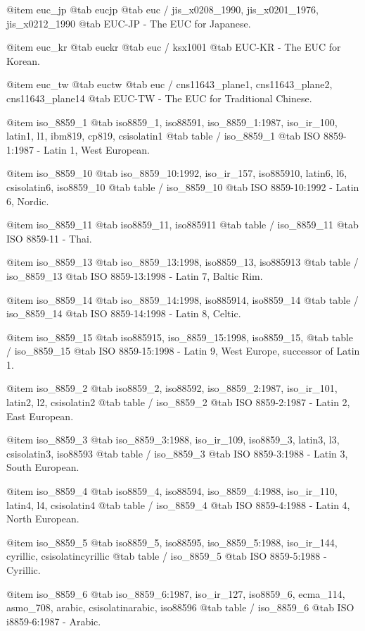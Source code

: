 @item
euc_jp
@tab
eucjp
@tab
euc / jis_x0208_1990, jis_x0201_1976, jis_x0212_1990
@tab
EUC-JP - The EUC for Japanese.


@item
euc_kr
@tab
euckr
@tab
euc / ksx1001
@tab
EUC-KR - The EUC for Korean.


@item
euc_tw
@tab
euctw
@tab
euc / cns11643_plane1, cns11643_plane2, cns11643_plane14
@tab
EUC-TW - The EUC for Traditional Chinese.


@item
iso_8859_1
@tab
iso8859_1, iso88591, iso_8859_1:1987, iso_ir_100, latin1, l1, ibm819, cp819, csisolatin1
@tab
table / iso_8859_1
@tab
ISO 8859-1:1987 - Latin 1, West European.


@item
iso_8859_10
@tab
iso_8859_10:1992, iso_ir_157, iso885910, latin6, l6, csisolatin6, iso8859_10
@tab
table / iso_8859_10
@tab
ISO 8859-10:1992 - Latin 6, Nordic.


@item
iso_8859_11
@tab
iso8859_11, iso885911
@tab
table / iso_8859_11
@tab
ISO 8859-11 - Thai.


@item
iso_8859_13
@tab
iso_8859_13:1998, iso8859_13, iso885913
@tab
table / iso_8859_13
@tab
ISO 8859-13:1998 - Latin 7, Baltic Rim.


@item
iso_8859_14
@tab
iso_8859_14:1998, iso885914, iso8859_14
@tab
table / iso_8859_14
@tab
ISO 8859-14:1998 - Latin 8, Celtic.


@item
iso_8859_15
@tab
iso885915, iso_8859_15:1998, iso8859_15, 
@tab
table / iso_8859_15
@tab
ISO 8859-15:1998 - Latin 9, West Europe, successor of Latin 1.


@item
iso_8859_2
@tab
iso8859_2, iso88592, iso_8859_2:1987, iso_ir_101, latin2, l2, csisolatin2
@tab
table / iso_8859_2
@tab
ISO 8859-2:1987 - Latin 2, East European.


@item
iso_8859_3
@tab
iso_8859_3:1988, iso_ir_109, iso8859_3, latin3, l3, csisolatin3, iso88593
@tab
table / iso_8859_3
@tab
ISO 8859-3:1988 - Latin 3, South European.


@item
iso_8859_4
@tab
iso8859_4, iso88594, iso_8859_4:1988, iso_ir_110, latin4, l4, csisolatin4
@tab
table / iso_8859_4
@tab
ISO 8859-4:1988 - Latin 4, North European.


@item
iso_8859_5
@tab
iso8859_5, iso88595, iso_8859_5:1988, iso_ir_144, cyrillic, csisolatincyrillic
@tab
table / iso_8859_5
@tab
ISO 8859-5:1988 - Cyrillic.


@item
iso_8859_6
@tab
iso_8859_6:1987, iso_ir_127, iso8859_6, ecma_114, asmo_708, arabic, csisolatinarabic, iso88596
@tab
table / iso_8859_6
@tab
ISO i8859-6:1987 - Arabic.


